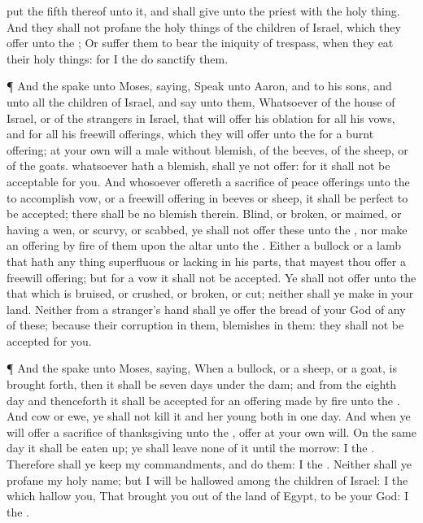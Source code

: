 {put the
fifth
{} thereof unto it, and shall
give
{} unto the
priest with the holy
thing.
And they shall not
profane the holy
things of the
children of
Israel, which they
offer unto the
{};
Or suffer them to
bear the
iniquity of
trespass, when they
eat their holy
things: for I the
{} do
sanctify them.
\par }{\PP {}¶ And the
{}
spake unto
Moses,
saying,
Speak unto
Aaron, and to his
sons, and unto all the
children of
Israel, and
say unto them,
Whatsoever
{} of the
house of
Israel, or of the
strangers in
Israel, that will
offer his
oblation for all his
vows, and for all his freewill
offerings, which they will
offer unto the
{} for a burnt
offering;
 at your own
will a
male without
blemish, of the
beeves, of the
sheep, or of the
goats.
 whatsoever hath a
blemish,
{} shall ye not
offer: for it shall not be
acceptable for you.
And
whosoever
offereth a
sacrifice of peace
offerings unto the
{} to
accomplish
{}
vow, or a freewill
offering in
beeves or
sheep, it shall be
perfect to be
accepted; there shall be no
blemish therein.
Blind, or
broken, or
maimed, or having a
wen, or
scurvy, or
scabbed, ye shall not
offer these unto the
{}, nor
make an offering by
fire of them upon the
altar unto the
{}.
Either a
bullock or a
lamb that hath any thing
superfluous or lacking in his
parts, that mayest thou
offer
{} a freewill
offering; but for a
vow it shall not be
accepted.
Ye shall not
offer unto the
{} that which is
bruised, or
crushed, or
broken, or
cut; neither shall ye
make
{} in your
land.
Neither from a
stranger’s
hand shall ye
offer the
bread of your
God of any of these; because their
corruption
{} in them,
{}
blemishes
{} in them: they shall not be
accepted for you.
\par }{\PP {}¶ And the
{}
spake unto
Moses,
saying,
When a
bullock, or a
sheep, or a
goat, is brought
forth, then it shall be
seven
days under the
dam; and from the
eighth
day and
thenceforth it shall be
accepted for an
offering made by
fire unto the
{}.
And
{}
cow or
ewe, ye shall not
kill it and her
young both in
one
day.
And when ye will
offer a
sacrifice of
thanksgiving unto the
{},
offer
{} at your own
will.
On the same
day it shall be eaten
up; ye shall
leave none of it until the
morrow: I
{} the
{}.
Therefore shall ye
keep my
commandments, and
do them: I
{} the
{}.
Neither shall ye
profane my
holy
name; but I will be
hallowed
among the
children of
Israel: I
{} the
{} which
hallow you,
That brought you
out of the
land of
Egypt, to be your
God: I
{} the
{}.

}
